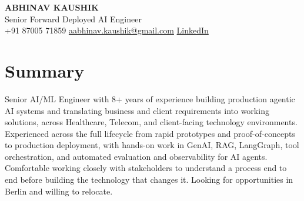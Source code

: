 \documentclass[10pt,a4paper]{article}
\begin{document}
\begin{center}
  {\LARGE\bfseries ABHINAV KAUSHIK}\\[2pt]
  {\large Senior Forward Deployed AI Engineer}\\[2pt]
  +91 87005 71859 \textbar{} \href{mailto:aabhinav.kaushik@gmail.com}{aabhinav.kaushik@gmail.com} \textbar{} \href{https://linkedin.com/in/abhinav-kaushik10/}{LinkedIn}  
\end{center}

\section{Summary}
Senior AI/ML Engineer with 8+ years of experience building production agentic AI systems and translating business and client requirements into working solutions, across Healthcare, Telecom, and client-facing technology environments. Experienced across the full lifecycle from rapid prototypes and proof-of-concepts to production deployment, with hands-on work in GenAI, RAG, LangGraph, tool orchestration, and automated evaluation and observability for AI agents. Comfortable working closely with stakeholders to understand a process end to end before building the technology that changes it. Looking for opportunities in Berlin and willing to relocate.
\end{document}
